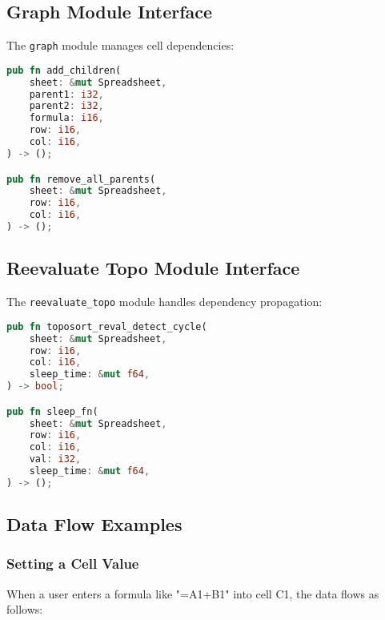 \documentclass[11pt,a4paper]{article}
\begin{document}
\subsection{Graph Module Interface}

The \texttt{graph} module manages cell dependencies:

\begin{lstlisting}[language=Rust, caption={Graph module interface}, label=lst:graph-api]
pub fn add_children(
    sheet: &mut Spreadsheet,
    parent1: i32,
    parent2: i32,
    formula: i16,
    row: i16,
    col: i16,
) -> ();

pub fn remove_all_parents(
    sheet: &mut Spreadsheet,
    row: i16,
    col: i16,
) -> ();
\end{lstlisting}

\subsection{Reevaluate Topo Module Interface}

The \texttt{reevaluate\_topo} module handles dependency propagation:

\begin{lstlisting}[language=Rust, caption={Reevaluate topo module interface}, label=lst:reevaluate-api]
pub fn toposort_reval_detect_cycle(
    sheet: &mut Spreadsheet,
    row: i16,
    col: i16,
    sleep_time: &mut f64,
) -> bool;

pub fn sleep_fn(
    sheet: &mut Spreadsheet,
    row: i16,
    col: i16,
    val: i32,
    sleep_time: &mut f64,
) -> ();
\end{lstlisting}

\subsection{Data Flow Examples}

\subsubsection{Setting a Cell Value}

When a user enters a formula like "=A1+B1" into cell C1, the data flows as follows:
\end{document}
